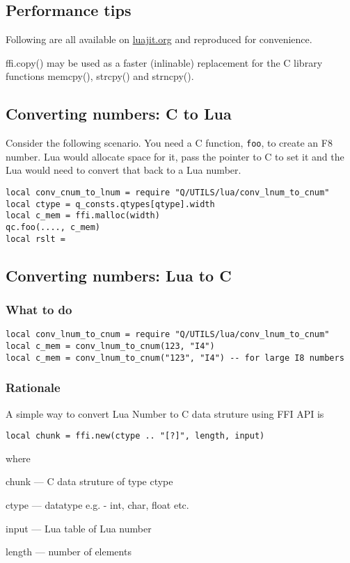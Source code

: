 \subsection{Performance tips}
Following are all available on \url{luajit.org} and reproduced for convenience. 

\be
\item 
ffi.copy() may be used as a faster (inlinable) replacement
 for the C library functions memcpy(), strcpy() and strncpy().
\ee

\subsection{Converting numbers: C to Lua}
\label{cnum_to_lnum}

Consider the following scenario. 
You need a C function, {\tt foo}, to create an F8 number.
Lua would allocate space for it, pass the pointer to C to set it and the Lua
would need to convert that back to a Lua number.
\begin{verbatim}
local conv_cnum_to_lnum = require "Q/UTILS/lua/conv_lnum_to_cnum"
local ctype = q_consts.qtypes[qtype].width
local c_mem = ffi.malloc(width)
qc.foo(...., c_mem)
local rslt = 
\end{verbatim}

\subsection{Converting numbers: Lua to C}
\label{lnum_to_cnum}

\subsubsection{What to do}

\begin{verbatim}
local conv_lnum_to_cnum = require "Q/UTILS/lua/conv_lnum_to_cnum"
local c_mem = conv_lnum_to_cnum(123, "I4")
local c_mem = conv_lnum_to_cnum("123", "I4") -- for large I8 numbers
\end{verbatim}

\subsubsection{Rationale}
A simple way to convert Lua Number to C data struture using FFI API is
\begin{verbatim}
local chunk = ffi.new(ctype .. "[?]", length, input)
\end{verbatim}
where
\be
\item 
\item chunk  ---  C data struture of type ctype
\item ctype  ---  datatype e.g. -  int, char, float etc.
\item input  ---  Lua table of Lua number
\item length ---  number of elements
\ee

